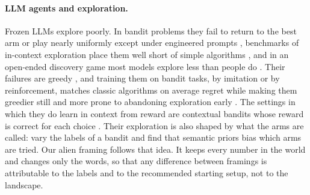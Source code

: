 \paragraph{LLM agents and exploration.}
Frozen LLMs explore poorly. In bandit problems they fail to return to the best arm or play nearly uniformly
except under engineered prompts \citep{krishnamurthy2024explore}, benchmarks of in-context exploration place
them well short of simple algorithms \citep{nie2024evolve}, and in an open-ended discovery game most models
explore less than people do \citep{pan2025think}. Their failures are greedy \citep{schmied2025greedy}, and
training them on bandit tasks, by imitation or by reinforcement, matches classic algorithms on average regret
while making them greedier still and more prone to abandoning exploration early \citep{chen2025greedy}. The
settings in which they do learn in context from reward are contextual bandits whose reward is correct for
each choice \citep{monea2024bandit}. Their exploration is also shaped by what the arms are called:
\citet{austin2026semantic} vary the labels of a bandit and find that semantic priors bias which arms are
tried. Our alien framing follows that idea. It keeps every number in the world and changes only the words,
so that any difference between framings is attributable to the labels and to the recommended starting setup,
not to the landscape.

